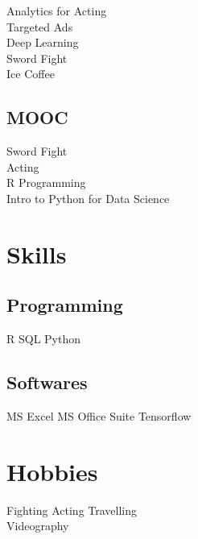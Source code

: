 \documentclass[]{ds-resume}
\begin{document}
\begin{minipage}[t]{0.33\textwidth}
Analytics for Acting \\
Targeted Ads \\
Deep Learning \\
Sword Fight \\
Ice Coffee \\
\sectionsep

\subsection{MOOC}
Sword Fight \\
Acting \\
R Programming \\
Intro to Python for Data Science  \\
\sectionsep


\section{Skills}
\subsection{Programming}
R \textbullet{}   SQL \textbullet{} Python \\  
\sectionsep

\subsection{Softwares}
MS Excel \textbullet{}   MS Office Suite \textbullet{} Tensorflow \\
\sectionsep

\section{Hobbies}
Fighting \textbullet{} Acting \textbullet{} Travelling \textbullet{}\\
Videography
\sectionsep


%
%

\end{minipage} 
\hfill
\end{document}
